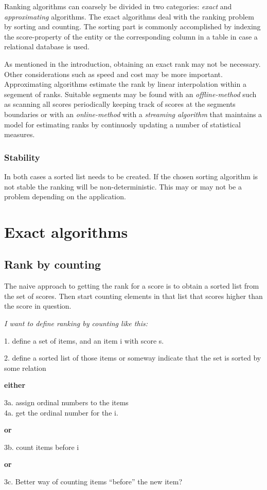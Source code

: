 Ranking algorithms can coarsely be divided in two categories: \emph{exact} and \emph{approximating} algorithms. The exact algorithms deal with the ranking problem by sorting and counting. The sorting part is commonly accomplished by indexing the score-property of the entity or the corresponding column in a table in case a relational database is used.  

As mentioned in the introduction, obtaining an exact rank may not be necessary. Other considerations such as speed and cost may be more important. Approximating algorithms estimate the rank by linear interpolation within a segement of ranks. Suitable segments may be found with an \emph{offline-method} such as scanning all scores periodically keeping track of scores at the segments boundaries or with an \emph{online-method} with a \emph{streaming algorithm} that maintains a model for estimating ranks by continuosly updating a number of statistical measures.


\subsubsection{Stability}

In both cases a sorted list needs to be created. If the chosen sorting algorithm is not stable the ranking will be non-deterministic. This may or may not be a problem depending on the application. 

\section{Exact algorithms}

\subsection{Rank by counting}

The naive approach to getting the rank for a score is to obtain a sorted list from the set of scores. Then start counting elements in that list that scores higher than the score in question.

\begin{shaded}

 \emph{I want to define ranking by counting like this:}

  1. define a set of items, and an item i with score s.

  2. define a sorted list of those items or someway indicate that the set is sorted by some relation

\textbf{either}
  
  3a. assign ordinal numbers to the items \\
  4a. get the ordinal number for the i.

 \textbf{or}

  3b. count items before i

\textbf{or}

  3c. Better way of counting items ``before'' the new item?
  
\end{shaded}

